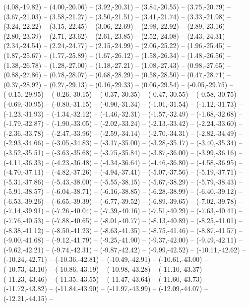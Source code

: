 {  (4.08,-19.82) -- (4.00,-20.06) -- (3.92,-20.31) -- (3.84,-20.55) -- (3.75,-20.79) -- (3.67,-21.03) -- (3.58,-21.27) --
  (3.50,-21.51) -- (3.41,-21.74) -- (3.33,-21.98) -- (3.24,-22.22) -- (3.15,-22.45) -- (3.06,-22.69) -- (2.98,-22.92) --
  (2.89,-23.16) -- (2.80,-23.39) -- (2.71,-23.62) -- (2.61,-23.85) -- (2.52,-24.08) -- (2.43,-24.31) -- (2.34,-24.54) --
  (2.24,-24.77) -- (2.15,-24.99) -- (2.06,-25.22) -- (1.96,-25.45) -- (1.87,-25.67) -- (1.77,-25.89) -- (1.67,-26.12) --
  (1.58,-26.34) -- (1.48,-26.56) -- (1.38,-26.78) -- (1.28,-27.00) -- (1.18,-27.21) -- (1.08,-27.43) -- (0.98,-27.65) --
  (0.88,-27.86) -- (0.78,-28.07) -- (0.68,-28.29) -- (0.58,-28.50) -- (0.47,-28.71) -- (0.37,-28.92) -- (0.27,-29.13) --
  (0.16,-29.33) -- (0.06,-29.54) -- (-0.05,-29.75) -- (-0.15,-29.95) -- (-0.26,-30.15) -- (-0.37,-30.35) -- (-0.47,-30.55) --
  (-0.58,-30.75) -- (-0.69,-30.95) -- (-0.80,-31.15) -- (-0.90,-31.34) -- (-1.01,-31.54) -- (-1.12,-31.73) -- (-1.23,-31.93) --
  (-1.34,-32.12) -- (-1.46,-32.31) -- (-1.57,-32.49) -- (-1.68,-32.68) -- (-1.79,-32.87) -- (-1.90,-33.05) -- (-2.02,-33.24) --
  (-2.13,-33.42) -- (-2.24,-33.60) -- (-2.36,-33.78) -- (-2.47,-33.96) -- (-2.59,-34.14) -- (-2.70,-34.31) -- (-2.82,-34.49) --
  (-2.93,-34.66) -- (-3.05,-34.83) -- (-3.17,-35.00) -- (-3.28,-35.17) -- (-3.40,-35.34) -- (-3.52,-35.51) -- (-3.63,-35.68) --
  (-3.75,-35.84) -- (-3.87,-36.00) -- (-3.99,-36.16) -- (-4.11,-36.33) -- (-4.23,-36.48) -- (-4.34,-36.64) -- (-4.46,-36.80) --
  (-4.58,-36.95) -- (-4.70,-37.11) -- (-4.82,-37.26) -- (-4.94,-37.41) -- (-5.07,-37.56) -- (-5.19,-37.71) -- (-5.31,-37.86) --
  (-5.43,-38.00) -- (-5.55,-38.15) -- (-5.67,-38.29) -- (-5.79,-38.43) -- (-5.91,-38.57) -- (-6.04,-38.71) -- (-6.16,-38.85) --
  (-6.28,-38.99) -- (-6.40,-39.12) -- (-6.53,-39.26) -- (-6.65,-39.39) -- (-6.77,-39.52) -- (-6.89,-39.65) -- (-7.02,-39.78) --
  (-7.14,-39.91) -- (-7.26,-40.04) -- (-7.39,-40.16) -- (-7.51,-40.29) -- (-7.63,-40.41) -- (-7.76,-40.53) -- (-7.88,-40.65) --
  (-8.01,-40.77) -- (-8.13,-40.89) -- (-8.25,-41.01) -- (-8.38,-41.12) -- (-8.50,-41.23) -- (-8.63,-41.35) -- (-8.75,-41.46) --
  (-8.87,-41.57) -- (-9.00,-41.68) -- (-9.12,-41.79) -- (-9.25,-41.90) -- (-9.37,-42.00) -- (-9.49,-42.11) -- (-9.62,-42.21) --
  (-9.74,-42.31) -- (-9.87,-42.42) -- (-9.99,-42.52) -- (-10.11,-42.62) -- (-10.24,-42.71) -- (-10.36,-42.81) -- (-10.49,-42.91) --
  (-10.61,-43.00) -- (-10.73,-43.10) -- (-10.86,-43.19) -- (-10.98,-43.28) -- (-11.10,-43.37) -- (-11.23,-43.46) -- (-11.35,-43.55) --
  (-11.47,-43.64) -- (-11.60,-43.73) -- (-11.72,-43.82) -- (-11.84,-43.90) -- (-11.97,-43.99) -- (-12.09,-44.07) -- (-12.21,-44.15) --
}
